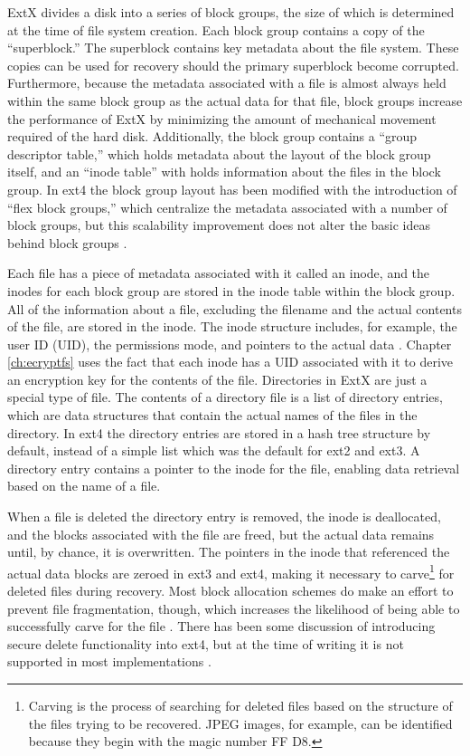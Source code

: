 ExtX divides a disk into a series of block groups, the size of which is determined at the time of file system creation.  Each block
group contains a copy of the ``superblock.'' The superblock contains key metadata about the file system.  These copies can be used
for recovery should the primary superblock become corrupted.  Furthermore, because the metadata associated with a file is almost
always held within the same block group as the actual data for that file, block groups increase the performance of ExtX by
minimizing the amount of mechanical movement required of the hard disk. Additionally, the block group contains a ``group descriptor
table,'' which holds metadata about the layout of the block group itself, and an ``inode table'' with holds information about the
files in the block group. In ext4 the block group layout has been modified with the introduction of ``flex block groups,'' which
centralize the metadata associated with a number of block groups, but this scalability improvement does not alter the basic ideas
behind block groups \cite{ext4implications}.

Each file has a piece of metadata associated with it called an inode, and the inodes for each block group are stored in the inode
table within the block group. All of the information about a file, excluding the filename and the actual contents of the file, are
stored in the inode. The inode structure includes, for example, the user ID (UID), the permissions mode, and pointers to the actual
data \cite[p.  457]{carrier}. Chapter \ref{ch:ecryptfs} uses the fact that each inode has a UID associated with it to derive an
encryption key for the contents of the file. Directories in ExtX are just a special type of file. The contents of a directory file
is a list of directory entries, which are data structures that contain the actual names of the files in the directory. In ext4 the
directory entries are stored in a hash tree structure by default, instead of a simple list which was the default for ext2 and ext3.
A directory entry contains a pointer to the inode for the file, enabling data retrieval based on the name of a file. 

When a file is deleted the directory entry is removed, the inode is deallocated, and the blocks associated with the file are freed,
but the actual data remains until, by chance, it is overwritten. The pointers in the inode that referenced the actual
data blocks are zeroed in ext3 and ext4, making it necessary to carve\footnote{Carving is the process of searching
for deleted files based on the structure of the files trying to be recovered. JPEG images, for example, can be identified because
they begin with the magic number FF D8.} for deleted files during recovery.  Most block allocation schemes do make an effort to
prevent file fragmentation, though, which increases the likelihood of being able to successfully carve for the file
\cite{ext4implications}. There has been some discussion of introducing secure delete functionality into ext4, but at the
time of writing it is not supported in most implementations \cite{ext4securedelete}.

